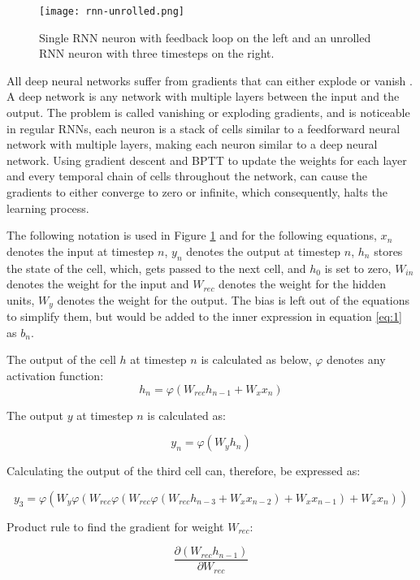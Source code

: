 \documentclass[../main.tex]{subfiles}
\begin{document}
\begin{figure}[H]
\centering
\texttt{[image: rnn-unrolled.png]}
\caption{Single RNN neuron with feedback loop on the left and an unrolled RNN neuron with three timesteps on the right.}
\label{fig:unrolled}
\end{figure}

All deep neural networks suffer from gradients that can either explode or vanish \cite{di_2018}. A deep network is any network with multiple layers between the input and the output. The problem is called vanishing or exploding gradients, and is noticeable in regular RNNs, each neuron is a stack of cells similar to a feedforward neural network with multiple layers, making each neuron similar to a deep neural network. Using gradient descent and BPTT to update the weights for each layer and every temporal chain of cells throughout the network, can cause the gradients to either converge to zero or infinite, which consequently, halts the learning process.

The following notation is used in Figure \ref{fig:unrolled} and for the following equations, $x_n$ denotes the input at timestep $n$, $y_n$ denotes the output at timestep $n$, $h_n$ stores the state of the cell, which, gets passed to the next cell, and $h_0$ is set to zero, $W_{in}$ denotes the weight for the input and $W_{rec}$ denotes the weight for the hidden units, $W_y$ denotes the weight for the output. The bias is left out of the equations to simplify them, but would be added to the inner expression in equation \ref{eq:1} as $b_n$.

The output of the cell $h$ at timestep $n$ is calculated as below, $\varphi$ denotes any activation function:
\begin{equation}\label{eq:1}
h_n = \varphi \left( W_{rec} h_{n-1} + W_x x_n \right)
\end{equation}

The output $y$ at timestep $n$ is calculated as:

$$y_n = \varphi \left( W_y h_n \right)$$

Calculating the output of the third cell can, therefore, be expressed as:

$$y_3 = \varphi \left( 
W_y \varphi \left( 
	W_{rec} \varphi \left( 
		W_{rec} \varphi \left( 
			W_{rec} h_{n-3} + W_x x_{n-2} \right)
				+ W_x x_{n-1} \right) 
					+ W_x x_n \right) \right)$$

Product rule to find the gradient for weight $W_{rec}$:

$$\frac{\partial \left( W_{rec} h_{n-1}\right)} {\partial W_{rec}}$$
\end{document}
